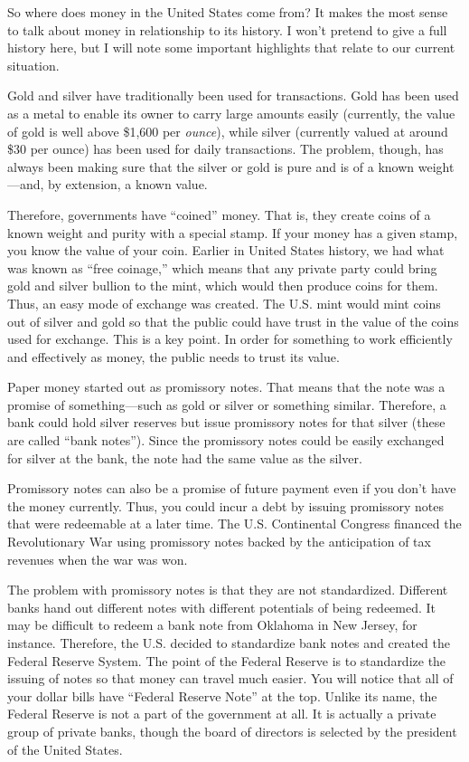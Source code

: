 So where does money in the United States come from?  It makes the most
sense to talk about money in relationship to its history. I won’t
pretend to give a full history here, but I will note some important
highlights that relate to our current situation.  


Gold and silver have traditionally been used for transactions. Gold has
been used as a metal to enable its owner to carry large amounts easily
(currently, the value of gold is well above \$1,600 per
\textit{ounce}), while silver (currently valued at around \$30 per
ounce) has been used for daily transactions. The problem, though, has
always been making sure that the silver or gold is pure and is of a
known weight—and, by extension, a known value. 


Therefore, governments have “coined” money. That is, they create coins
of a known weight and purity with a special stamp. If your money has a
given stamp, you know the value of your coin. Earlier in United States
history, we had what was known as “free coinage,” which means that any
private party could bring gold and silver bullion to the mint, which
would then produce coins for them. Thus, an easy mode of exchange was
created. The U.S. mint would mint coins out of silver and gold so that
the public could have trust in the value of the coins used for
exchange. This is a key point. In order for something to work
efficiently and effectively as money, the public needs to trust its
value.


Paper money started out as promissory notes. That means that the note
was a promise of something—such as gold or silver or something similar.
Therefore, a bank could hold silver reserves but issue promissory notes
for that silver (these are called “bank notes”). Since the promissory
notes could be easily exchanged for silver at the bank, the note had
the same value as the silver. 


Promissory notes can also be a promise of future payment even if you
don’t have the money
currently. Thus, you
could incur a debt by issuing promissory notes that were redeemable at
a later time. The U.S. Continental Congress financed the Revolutionary
War using promissory notes backed by the anticipation of tax revenues
when the war was won.


The problem with promissory notes is that they are not standardized.
Different banks hand out different notes with different potentials of
being redeemed. It may be difficult to redeem a bank note from Oklahoma
in New Jersey, for instance. Therefore, the U.S. decided to standardize
bank notes and created the Federal Reserve System. The point of the
Federal Reserve is to standardize the issuing of notes so that money
can travel much easier. You will notice that all of your dollar bills
have “Federal Reserve Note” at the top.  Unlike its name, the Federal
Reserve is not a part of the government at all.  It is actually a
private group of private banks, though the board of directors is
selected by the president of the United States.


